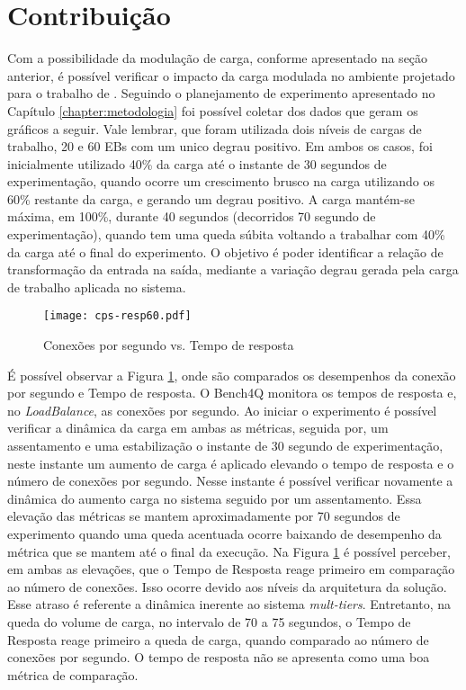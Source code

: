 \section{Contribuição}
Com a possibilidade da modulação de carga, conforme apresentado na seção anterior, é possível verificar o impacto da carga modulada no ambiente projetado para o trabalho de . Seguindo o planejamento de experimento apresentado no Capítulo \ref{chapter:metodologia} foi possível coletar dos dados que geram os gráficos a seguir.
Vale lembrar, que foram utilizada dois níveis de cargas de trabalho, 20 e 60 EBs com um unico degrau positivo. Em ambos os casos, foi inicialmente utilizado 40\% da carga até o instante de 30 segundos de experimentação, quando ocorre um crescimento brusco na carga utilizando os 60\% restante da carga, e gerando um degrau positivo. A carga mantém-se máxima, em 100\%, durante 40 segundos (decorridos 70 segundo de experimentação), quando tem uma queda súbita voltando a trabalhar com 40\% da carga até o final do experimento. O objetivo é poder identificar a relação de transformação da entrada na saída, mediante a variação degrau gerada pela carga de trabalho aplicada no sistema.

\begin{figure}[htb]
	\centering
	\texttt{[image: cps-resp60.pdf]}	
	\caption{Conexões por segundo vs. Tempo de resposta}
	\label{fig:cps-resp60}
	\fdadospesquisa
\end{figure}

É possível observar a Figura \ref{fig:cps-resp60}, onde são comparados os desempenhos da conexão por segundo e Tempo de resposta. O Bench4Q monitora os tempos de resposta e, no \textit{LoadBalance}, as conexões por segundo. Ao iniciar o experimento é possível verificar a dinâmica da carga em ambas as métricas, seguida por, um assentamento e uma estabilização o instante de 30 segundo de experimentação, neste instante um aumento de carga é aplicado elevando o tempo de resposta e o número de conexões por segundo. Nesse instante é possível verificar novamente a dinâmica do aumento carga no sistema seguido por um assentamento. Essa elevação das métricas se mantem aproximadamente por 70 segundos de experimento quando uma queda acentuada ocorre baixando de desempenho da métrica que se mantem até o final da execução. 
Na Figura \ref{fig:cps-resp60} é possível perceber, em ambas as elevações, que o Tempo de Resposta reage primeiro em comparação ao número de conexões. Isso ocorre devido aos níveis da arquitetura da solução. Esse atraso é referente a dinâmica inerente ao sistema \textit{mult-tiers}. Entretanto, na queda do volume de carga, no intervalo de 70 a 75 segundos, o Tempo de Resposta reage primeiro a queda de carga, quando comparado ao número de conexões por segundo. O tempo de resposta não se apresenta como uma boa métrica de comparação. 


